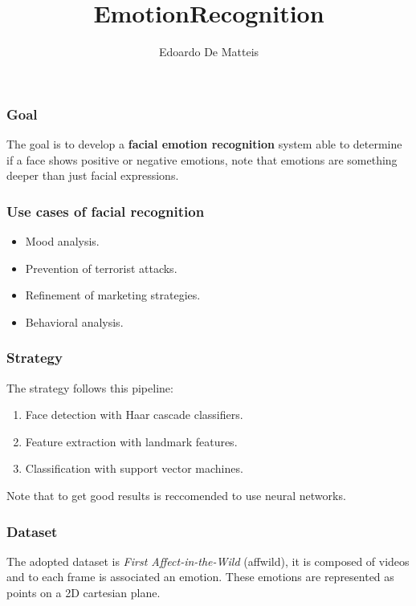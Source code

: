 \documentclass{beamer}
\title{EmotionRecognition}
\author{Edoardo De Matteis}
\institute[Sapienza Università di Roma Computer Science]
\begin{document}
\frame{\titlepage}

\begin{frame}
    \frametitle{Goal}
    The goal is to develop a \textbf{facial emotion recognition} system able to determine if a face shows positive or negative emotions, note that emotions are something deeper than just facial expressions.
\end{frame}

\begin{frame}
    \frametitle{Use cases of facial recognition}
    \begin{itemize}
        \item Mood analysis.
        \item Prevention of terrorist attacks.
        \item Refinement of marketing strategies.
        \item Behavioral analysis.
    \end{itemize}
\end{frame}

\begin{frame}
    \frametitle{Strategy}
    The strategy follows this pipeline:
    \begin{enumerate}
        \item Face detection with Haar cascade classifiers.
        \item Feature extraction with landmark features.
        \item Classification with support vector machines.
    \end{enumerate}
    Note that to get good results is reccomended to use neural networks.
\end{frame}

\begin{frame}
    \frametitle{Dataset}
    The adopted dataset is \textit{First Affect-in-the-Wild} (affwild), it is composed of videos and to each frame is associated an emotion. 
    These emotions are represented as points on a 2D cartesian plane.
\end{frame}
\end{document}

